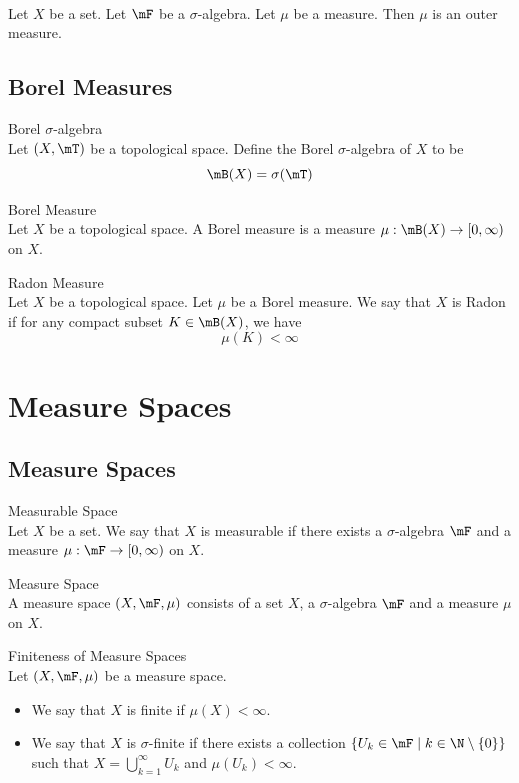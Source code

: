 \documentclass[a4paper]{article}
\begin{document}
\begin{lmm}{}{}\\
Let $X$ be a set. Let $\mF$ be a $\sigma$-algebra. Let $\mu$ be a measure. Then $\mu$ is an outer measure. 
\end{lmm}

\subsection{Borel Measures}
\begin{defn}{Borel $\sigma$-algebra}{}\\
Let $(X,\mT)$ be a topological space. Define the Borel $\sigma$-algebra of $X$ to be $$\mB(X)=\sigma(\mT)$$
\end{defn}

\begin{defn}{Borel Measure}{}\\
Let $X$ be a topological space. A Borel measure is a measure $\mu:\mB(X)\to[0,\infty)$ on $X$. 
\end{defn}

\begin{defn}{Radon Measure}{}\\
Let $X$ be a topological space. Let $\mu$ be a Borel measure. We say that $X$ is Radon if for any compact subset $K\in\mB(X)$, we have $$\mu(K)<\infty$$
\end{defn}

\pagebreak
\section{Measure Spaces}
\subsection{Measure Spaces}
\begin{defn}{Measurable Space}{}\\
Let $X$ be a set. We say that $X$ is measurable if there exists a $\sigma$-algebra $\mF$ and a measure $\mu:\mF\to[0,\infty)$ on $X$. 
\end{defn}

\begin{defn}{Measure Space}{}\\
A measure space $(X,\mF,\mu)$ consists of a set $X$, a $\sigma$-algebra $\mF$ and a measure $\mu$ on $X$. 
\end{defn}

\begin{defn}{Finiteness of Measure Spaces}{}\\
Let $(X,\mF,\mu)$ be a measure space. 
\begin{itemize}
\item We say that $X$ is finite if $\mu(X)<\infty$. 
\item We say that $X$ is $\sigma$-finite if there exists a collection $\{U_k\in\mF\;|\;k\in\N\setminus\{0\}\}$ such that $X=\bigcup_{k=1}^\infty U_k$ and $\mu(U_k)<\infty$. 
\end{itemize}
\end{defn}
\end{document}
